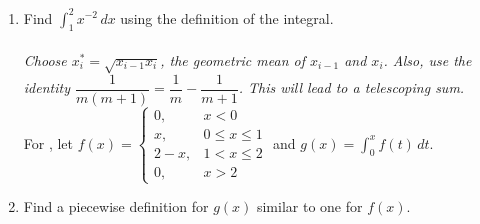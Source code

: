 \documentclass{book}
\newcommand{\dx}{\,dx}
\newcommand{\dt}{\,dt}
\newcommand{\dint}{\displaystyle \int}
\begin{document}
\begin{enumerate}[!HW!]
\item Find $\dint_1^2 x^{-2}\dx$ using the definition of the integral.\\\\
\emph{\color{magenta} Choose $x_i^* =\sqrt{x_{i-1}x_i}$, the geometric mean of $x_{i-1}$ and $x_i$. Also, use the identity $\dfrac{1}{m(m+1)} = \dfrac{1}{m}-\dfrac{1}{m+1}$. This will lead to a telescoping sum.}\\

For , let $f(x) = \begin{cases} 0, & x<0\\  x, & 0\le x\le 1\\ 2-x, & 1<x\le 2\\ 0, & x>2\end{cases}$ and $g(x) = \dint_0^x f(t)\dt$.
\item Find a piecewise definition for $g(x)$ similar to one for $f(x)$.
\end{enumerate}
\pagebreak
\appendix
{}
\end{document}
